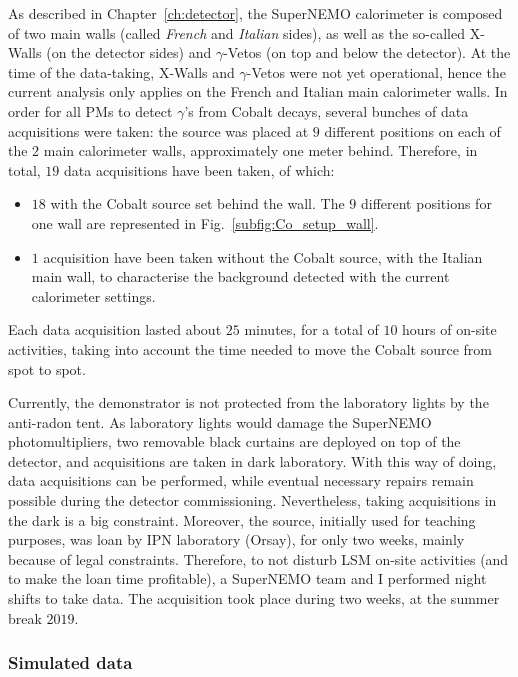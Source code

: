 As described in Chapter~\ref{ch:detector}, the SuperNEMO calorimeter is composed of two main walls (called \emph{French} and \emph{Italian} sides), as well as the so-called X-Walls (on the detector sides) and $\gamma$-Vetos (on top and below the detector).
At the time of the data-taking, X-Walls and $\gamma$-Vetos were not yet operational, hence the current analysis only applies on the French and Italian main calorimeter walls.
In order for all PMs to detect $\gamma$'s from Cobalt decays, several bunches of data acquisitions were taken:
the source was placed at $9$ different positions on each of the $2$ main calorimeter walls, approximately one meter behind.
Therefore, in total, $19$ data acquisitions have been taken, of which:
\begin{itemize}
\item $18$ with the Cobalt source set behind the wall. The $9$ different positions for one wall are represented in Fig.~\ref{subfig:Co_setup_wall}.
\item $1$ acquisition have been taken without the Cobalt source, with the Italian main wall, to characterise the background detected with the current calorimeter settings.
\end{itemize}
Each data acquisition lasted about $25$ minutes, for a total of $10$ hours of on-site activities, taking into account the time needed to move the Cobalt source from spot to spot.

Currently, the demonstrator is not protected from the laboratory lights by the anti-radon tent.
As laboratory lights would damage the SuperNEMO photomultipliers, two removable black curtains are deployed on top of the detector, and acquisitions are taken in dark laboratory.
With this way of doing, data acquisitions can be performed, while eventual necessary repairs remain possible during the detector commissioning.
Nevertheless, taking acquisitions in the dark is a big constraint.
Moreover, the source, initially used for teaching purposes, was loan by IPN laboratory (Orsay), for only two weeks, mainly because of legal constraints.
Therefore, to not disturb LSM on-site activities (and to make the loan time profitable), a SuperNEMO team and I performed night shifts to take data.
The acquisition took place during two weeks, at the summer break $2019$.

\subsubsection*{Simulated data}

